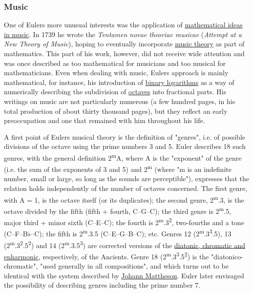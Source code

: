 \subsubsection{Music}\label{Music}

One of Euler\textquotesingle s more unusual interests was the application of \href{https://en.wikipedia.org/wiki/Music_and_mathematics}{mathematical ideas in music}. In 1739 he wrote the \emph{Tentamen novae theoriae musicae} (\emph{Attempt at a New Theory of Music}), hoping to eventually incorporate \href{https://en.wikipedia.org/wiki/Music_theory}{music theory} as part of mathematics. This part of his work, however, did not receive wide attention and was once described as too mathematical for musicians and too musical for mathematicians. Even when dealing with music, Euler\textquotesingle s approach is mainly mathematical, for instance, his introduction of \href{https://en.wikipedia.org/wiki/Binary_logarithm}{binary logarithms} as a way of numerically describing the subdivision of \href{https://en.wikipedia.org/wiki/Octave}{octaves} into fractional parts. His writings on music are not particularly numerous (a few hundred pages, in his total production of about thirty thousand pages), but they reflect an early preoccupation and one that remained with him throughout his life.

A first point of Euler\textquotesingle s musical theory is the definition of "genres", i.e. of possible divisions of the octave using the prime numbers 3 and 5. Euler describes 18 such genres, with the general definition 2\textsuperscript{m}A, where A is the "exponent" of the genre (i.e. the sum of the exponents of 3 and 5) and 2\textsuperscript{m} (where "m is an indefinite number, small or large, so long as the sounds are perceptible"), expresses that the relation holds independently of the number of octaves concerned. The first genre, with A = 1, is the octave itself (or its duplicates); the second genre, 2\textsuperscript{m}.3, is the octave divided by the fifth (fifth + fourth, C--G--C); the third genre is 2\textsuperscript{m}.5, major third + minor sixth (C--E--C); the fourth is 2\textsuperscript{m}.3\textsuperscript{2}, two-fourths and a tone (C--F--B{{{♭}}}--C); the fifth is 2\textsuperscript{m}.3.5 (C--E--G--B--C); etc. Genres 12 (2\textsuperscript{m}.3\textsuperscript{3}.5), 13 (2\textsuperscript{m}.3\textsuperscript{2}.5\textsuperscript{2}) and 14 (2\textsuperscript{m}.3.5\textsuperscript{3}) are corrected versions of the \href{https://en.wikipedia.org/wiki/Genus_(music)}{diatonic, chromatic and enharmonic}, respectively, of the Ancients. Genre 18 (2\textsuperscript{m}.3\textsuperscript{3}.5\textsuperscript{2}) is the "diatonico-chromatic", "used generally in all compositions", and which turns out to be identical with the system described by \href{https://en.wikipedia.org/wiki/Johann_Mattheson}{Johann Mattheson}. Euler later envisaged the possibility of describing genres including the prime number 7.


